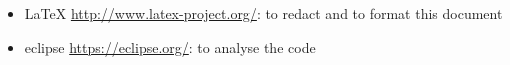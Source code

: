 \begin{itemize}
	\item LaTeX \url{http://www.latex-project.org/}: to redact and to format this document
	\item eclipse \url{https://eclipse.org/}: to analyse the code
\end{itemize}